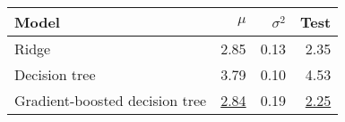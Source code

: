 \begin{tabular}{lrrr}
  \toprule
  Model                          & $\mu$            & $\sigma^2$ & Test
  \\
  \midrule
  Ridge                          & 2.85             & 0.13       & 2.35
  \\
  Decision tree                  & 3.79             & 0.10       & 4.53
  \\
  Gradient-boosted decision tree & \underline{2.84} & 0.19       & \underline{2.25}
  \\
  \bottomrule
\end{tabular}
